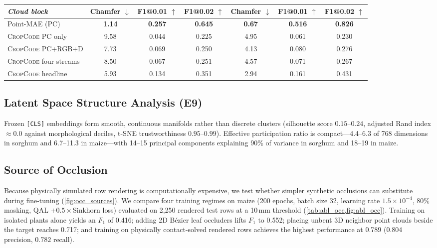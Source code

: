 \documentclass[10pt,twocolumn,letterpaper]{article}
\newcommand{\method}{\textsc{CropCode}}
\begin{document}
\begin{table}[t]
{\begin{tabular}{l ccc ccc}
    \midrule
    \emph{Cloud block} & Chamfer $\downarrow$ & F1@0.01 $\uparrow$ & F1@0.02 $\uparrow$ & Chamfer $\downarrow$ & F1@0.01 $\uparrow$ & F1@0.02 $\uparrow$ \\
    \midrule
    Point-MAE (PC) & \textbf{1.14} & \textbf{0.257} & \textbf{0.645} & \textbf{0.67} & \textbf{0.516} & \textbf{0.826} \\
    \method{} PC only & 9.58 & 0.044 & 0.225 & 4.95 & 0.061 & 0.230 \\
    \method{} PC+RGB+D & 7.73 & 0.069 & 0.250 & 4.13 & 0.080 & 0.276 \\
    \method{} four streams & 8.50 & 0.067 & 0.251 & 4.57 & 0.071 & 0.267 \\
    \method{} headline & 5.93 & 0.134 & 0.351 & 2.94 & 0.161 & 0.431 \\
    \bottomrule
  \end{tabular}}
\end{table}

\subsection{Latent Space Structure Analysis (E9)}
Frozen \texttt{[CLS]} embeddings form smooth, continuous manifolds rather than discrete clusters (silhouette score $0.15\text{--}0.24$, adjusted Rand index $\approx 0.0$ against morphological deciles, t-SNE trustworthiness $0.95\text{--}0.99$). Effective participation ratio is compact---4.4--6.3 of 768 dimensions in sorghum and 6.7--11.3 in maize---with 14--15 principal components explaining 90\% of variance in sorghum and 18--19 in maize.

\subsection{Source of Occlusion}
\label{sec:abl_occ}

Because physically simulated row rendering is computationally expensive, we test whether simpler synthetic occlusions can substitute during fine-tuning (\cref{fig:occ_sources}). We compare four training regimes on maize (200 epochs, batch size 32, learning rate $1.5 \times 10^{-4}$, 80\% masking, QAL $+ 0.5\times$Sinkhorn loss) evaluated on 2{,}250 rendered test rows at a 10\,mm threshold (\cref{tab:abl_occ,fig:abl_occ}). Training on isolated plants alone yields an $F_1$ of 0.416; adding 2D B\'ezier leaf occluders lifts $F_1$ to 0.552; placing unbent 3D neighbor point clouds beside the target reaches 0.717; and training on physically contact-solved rendered rows achieves the highest performance at 0.789 ($0.804$ precision, $0.782$ recall).
\end{document}
